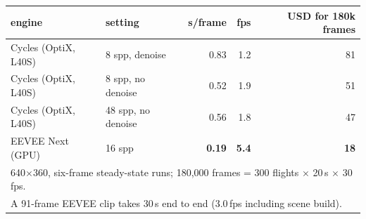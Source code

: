 \footnotesize
\begin{tabular}{llrrr}
\toprule
engine & setting & s/frame & fps & USD for 180k frames \\
\midrule
Cycles (OptiX, L40S) & 8 spp, denoise   & 0.83 & 1.2 & 81 \\
Cycles (OptiX, L40S) & 8 spp, no denoise & 0.52 & 1.9 & 51 \\
Cycles (OptiX, L40S) & 48 spp, no denoise & 0.56 & 1.8 & 47 \\
EEVEE Next (GPU)     & 16 spp           & \textbf{0.19} & \textbf{5.4} & \textbf{18} \\
\midrule
\multicolumn{5}{l}{\footnotesize 640$\times$360, six-frame steady-state runs; 180{,}000 frames = 300 flights $\times$ 20\,s $\times$ 30\,fps.}\\
\multicolumn{5}{l}{\footnotesize A 91-frame EEVEE clip takes 30\,s end to end (3.0\,fps including scene build).}\\
\bottomrule
\end{tabular}
